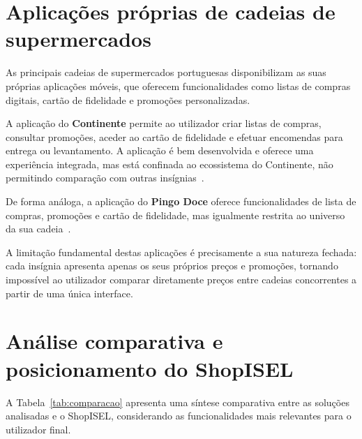 \section{Aplicações próprias de cadeias de supermercados}
\label{sec:3.3}

As principais cadeias de supermercados portuguesas disponibilizam as suas próprias aplicações móveis, que oferecem funcionalidades como listas de compras digitais, cartão de fidelidade e promoções personalizadas.

A aplicação do \textbf{Continente} permite ao utilizador criar listas de compras, consultar promoções, aceder ao cartão de fidelidade e efetuar encomendas para entrega ou levantamento. A aplicação é bem desenvolvida e oferece uma experiência integrada, mas está confinada ao ecossistema do Continente, não permitindo comparação com outras insígnias~\cite{continente-app}.

De forma análoga, a aplicação do \textbf{Pingo Doce} oferece funcionalidades de lista de compras, promoções e cartão de fidelidade, mas igualmente restrita ao universo da sua cadeia~\cite{pingodoce-app}.

A limitação fundamental destas aplicações é precisamente a sua natureza fechada: cada insígnia apresenta apenas os seus próprios preços e promoções, tornando impossível ao utilizador comparar diretamente preços entre cadeias concorrentes a partir de uma única interface.

\section{Análise comparativa e posicionamento do ShopISEL}
\label{sec:3.4}

A Tabela~\ref{tab:comparacao} apresenta uma síntese comparativa entre as soluções analisadas e o ShopISEL, considerando as funcionalidades mais relevantes para o utilizador final.

